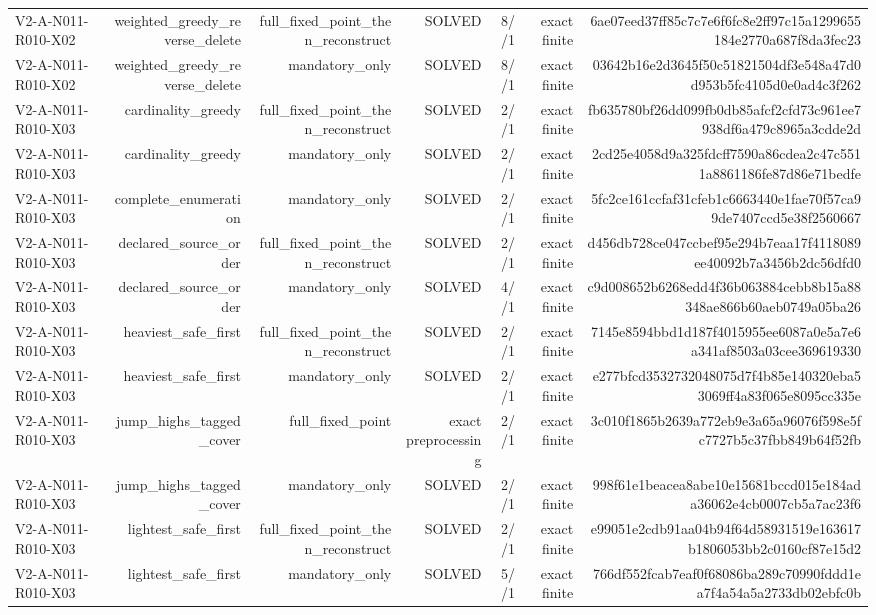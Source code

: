 {\begin{longtable}{lrrrrrr}
V2-A-N011-R010-X02 & weighted\_greedy\_reverse\_delete & full\_fixed\_point\_then\_reconstruct & SOLVED & 8//1 & exact finite & 6ae07eed37ff85c7c7e6f6fc8e2ff97c15a1299655184e2770a687f8da3fec23 \\
V2-A-N011-R010-X02 & weighted\_greedy\_reverse\_delete & mandatory\_only & SOLVED & 8//1 & exact finite & 03642b16e2d3645f50c51821504df3e548a47d0d953b5fc4105d0e0ad4c3f262 \\
V2-A-N011-R010-X03 & cardinality\_greedy & full\_fixed\_point\_then\_reconstruct & SOLVED & 2//1 & exact finite & fb635780bf26dd099fb0db85afcf2cfd73c961ee7938df6a479c8965a3cdde2d \\
V2-A-N011-R010-X03 & cardinality\_greedy & mandatory\_only & SOLVED & 2//1 & exact finite & 2cd25e4058d9a325fdcff7590a86cdea2c47c5511a8861186fe87d86e71bedfe \\
V2-A-N011-R010-X03 & complete\_enumeration & mandatory\_only & SOLVED & 2//1 & exact finite & 5fc2ce161ccfaf31cfeb1c6663440e1fae70f57ca99de7407ccd5e38f2560667 \\
V2-A-N011-R010-X03 & declared\_source\_order & full\_fixed\_point\_then\_reconstruct & SOLVED & 2//1 & exact finite & d456db728ce047ccbef95e294b7eaa17f4118089ee40092b7a3456b2dc56dfd0 \\
V2-A-N011-R010-X03 & declared\_source\_order & mandatory\_only & SOLVED & 4//1 & exact finite & c9d008652b6268edd4f36b063884cebb8b15a88348ae866b60aeb0749a05ba26 \\
V2-A-N011-R010-X03 & heaviest\_safe\_first & full\_fixed\_point\_then\_reconstruct & SOLVED & 2//1 & exact finite & 7145e8594bbd1d187f4015955ee6087a0e5a7e6a341af8503a03cee369619330 \\
V2-A-N011-R010-X03 & heaviest\_safe\_first & mandatory\_only & SOLVED & 2//1 & exact finite & e277bfcd3532732048075d7f4b85e140320eba53069ff4a83f065e8095cc335e \\
V2-A-N011-R010-X03 & jump\_highs\_tagged\_cover & full\_fixed\_point & exact preprocessing & 2//1 & exact finite & 3c010f1865b2639a772eb9e3a65a96076f598e5fc7727b5c37fbb849b64f52fb \\
V2-A-N011-R010-X03 & jump\_highs\_tagged\_cover & mandatory\_only & SOLVED & 2//1 & exact finite & 998f61e1beacea8abe10e15681bccd015e184ada36062e4cb0007cb5a7ac23f6 \\
V2-A-N011-R010-X03 & lightest\_safe\_first & full\_fixed\_point\_then\_reconstruct & SOLVED & 2//1 & exact finite & e99051e2cdb91aa04b94f64d58931519e163617b1806053bb2c0160cf87e15d2 \\
V2-A-N011-R010-X03 & lightest\_safe\_first & mandatory\_only & SOLVED & 5//1 & exact finite & 766df552fcab7eaf0f68086ba289c70990fddd1ea7f4a54a5a2733db02ebfc0b \\

\end{longtable}}
